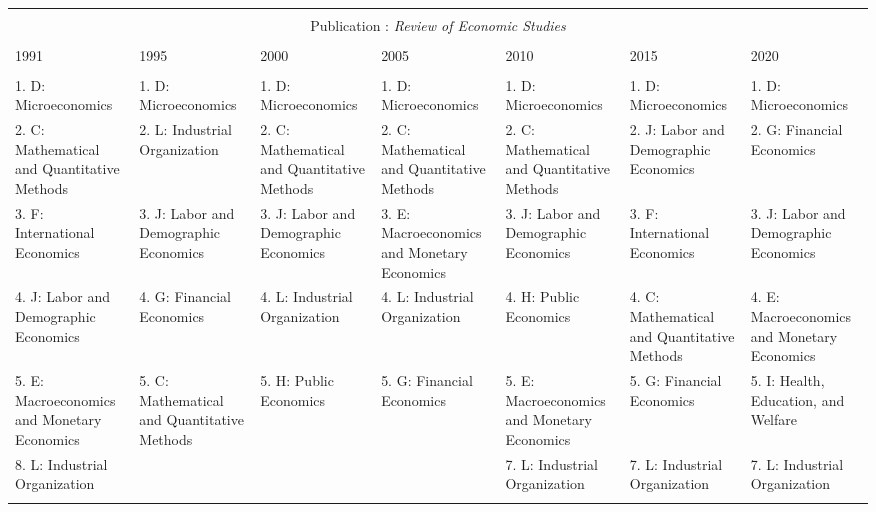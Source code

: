 
\begin{table}[h] \centering 
  \caption{} 
  \label{} 
\begin{tabular}{@{\extracolsep{5pt}} lllllll} 
\\[-1.8ex]\hline 
\hline \\[-1.8ex] \multicolumn{7}{c}{Publication : \textit{Review of Economic Studies}} \\
 \cline{1-7} \\
1991 & 1995 & 2000 & 2005 & 2010 & 2015 & 2020 \\ 
\hline \\[-1.8ex] 
1. D: Microeconomics & 1. D: Microeconomics & 1. D: Microeconomics & 1. D: Microeconomics & 1. D: Microeconomics & 1. D: Microeconomics & 1. D: Microeconomics \\ 
2. C: Mathematical and Quantitative Methods & 2. L: Industrial Organization & 2. C: Mathematical and Quantitative Methods & 2. C: Mathematical and Quantitative Methods & 2. C: Mathematical and Quantitative Methods & 2. J: Labor and Demographic Economics & 2. G: Financial Economics \\ 
3. F: International Economics & 3. J: Labor and Demographic Economics & 3. J: Labor and Demographic Economics & 3. E: Macroeconomics and Monetary Economics & 3. J: Labor and Demographic Economics & 3. F: International Economics & 3. J: Labor and Demographic Economics \\ 
4. J: Labor and Demographic Economics & 4. G: Financial Economics & 4. L: Industrial Organization & 4. L: Industrial Organization & 4. H: Public Economics & 4. C: Mathematical and Quantitative Methods & 4. E: Macroeconomics and Monetary Economics \\ 
5. E: Macroeconomics and Monetary Economics & 5. C: Mathematical and Quantitative Methods & 5. H: Public Economics & 5. G: Financial Economics & 5. E: Macroeconomics and Monetary Economics & 5. G: Financial Economics & 5. I: Health, Education, and Welfare \\ 
8. L: Industrial Organization &  &  &  & 7. L: Industrial Organization & 7. L: Industrial Organization & 7. L: Industrial Organization \\ 
\hline \\[-1.8ex] 
\end{tabular} 
\end{table} 

